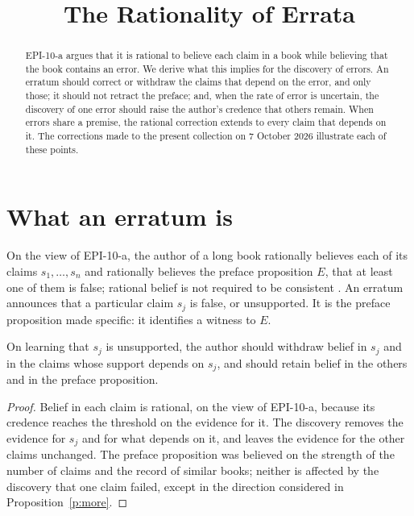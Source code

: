 \documentclass{situationist-preprint}
\title{The Rationality of Errata}
\begin{document}
\maketitle

\begin{abstract}
EPI-10-a argues that it is rational to believe each claim in a book while believing that the book contains an error. We derive what this implies for the discovery of errors. An erratum should correct or withdraw the claims that depend on the error, and only those; it should not retract the preface; and, when the rate of error is uncertain, the discovery of one error should raise the author's credence that others remain. When errors share a premise, the rational correction extends to every claim that depends on it. The corrections made to the present collection on 7 October 2026 illustrate each of these points.
\end{abstract}

\section{What an erratum is}

On the view of EPI-10-a, the author of a long book \citep{Makinson1965} rationally believes each of its claims $s_1, \ldots, s_n$ and rationally believes the preface proposition $E$, that at least one of them is false; rational belief is not required to be consistent \citep{Christensen2004}. An erratum announces that a particular claim $s_j$ is false, or unsupported. It is the preface proposition made specific: it identifies a witness to $E$.

\begin{proposition}\label{p:scope}
On learning that $s_j$ is unsupported, the author should withdraw belief in $s_j$ and in the claims whose support depends on $s_j$, and should retain belief in the others and in the preface proposition.
\end{proposition}

\begin{proof}
Belief in each claim is rational, on the view of EPI-10-a, because its credence reaches the threshold on the evidence for it. The discovery removes the evidence for $s_j$ and for what depends on it, and leaves the evidence for the other claims unchanged. The preface proposition was believed on the strength of the number of claims and the record of similar books; neither is affected by the discovery that one claim failed, except in the direction considered in Proposition~\ref{p:more}.
\end{proof}
\end{document}
